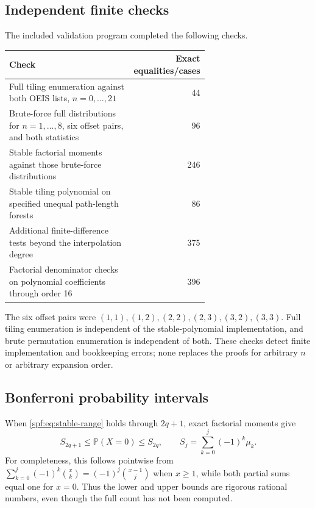 \documentclass[11pt]{article}
\numberwithin{equation}{section}
\theoremstyle{definition}
\theoremstyle{remark}
\theoremstyle{definition}
\newcommand{\Pp}{\mathbb P}
\begin{document}
\subsection{Independent finite checks}

The included validation program completed the following checks.
\begin{center}
\small
\begin{tabular}{p{0.65\linewidth}r}
\toprule
Check & Exact equalities/cases\\
\midrule
Full tiling enumeration against both OEIS lists, $n=0,\ldots,21$ & 44\\
Brute-force full distributions for $n=1,\ldots,8$, six offset pairs,
 and both statistics & 96\\
Stable factorial moments against those brute-force distributions & 246\\
Stable tiling polynomial on specified unequal path-length forests & 86\\
Additional finite-difference tests beyond the interpolation degree & 375\\
Factorial denominator checks on polynomial coefficients through order 16 & 396\\
\bottomrule
\end{tabular}
\end{center}
The six offset pairs were $(1,1),(1,2),(2,2),(2,3),(3,2),(3,3)$. Full tiling
enumeration is independent of the stable-polynomial implementation, and brute
permutation enumeration is independent of both. These checks detect finite
implementation and bookkeeping errors; none replaces the proofs for arbitrary
$n$ or arbitrary expansion order.

\subsection{Bonferroni probability intervals}

When \eqref{spf:eq:stable-range} holds through $2q+1$, exact factorial moments give
\begin{equation}
 S_{2q+1}\le\Pp(X=0)\le S_{2q},\qquad
 S_j=\sum_{k=0}^{j}(-1)^k\mu_k.
 \label{spf:eq:bonferroni}
\end{equation}
For completeness, this follows pointwise from
$\sum_{k=0}^{j}(-1)^k\binom{x}{k}=(-1)^j\binom{x-1}{j}$ when $x\ge1$,
while both partial sums equal one for $x=0$. Thus the lower and upper bounds
are rigorous rational numbers, even though the full count has not been
computed.
\end{document}

